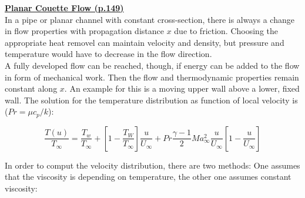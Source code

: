 \documentclass[8pt, landscape, fleqn]{scrartcl}
\begin{document}
\begin{multicols*}{3}
\underline{\textbf{Planar Couette Flow (p.149)}} \\
In a pipe or planar channel with constant cross-section, there is always a change in flow properties with propagation distance $x$ due to friction. Choosing the appropriate heat removel can maintain velocity and density, but pressure and temperature would have to decrease in the flow direction.\\
A fully developed flow can be reached, though, if energy can be added to the flow in form of mechanical work. Then the flow and thermodynamic properties remain constant along $x$. An example for this is a moving upper wall above a lower, fixed wall. The solution for the temperature distribution as function of local velocity is ($Pr = \mu c_p / k$):

\begin{equation*}
    \frac{T(u)}{T_\infty} = \frac{T_w}{T_\infty}+ \left[1-\frac{T_W}{T_\infty}\right]\frac{u}{U_\infty} + Pr \frac{\gamma-1}{2}Ma^2_\infty \frac{u}{U_\infty}\left[1-\frac{u}{U_\infty}\right]
\end{equation*}

In order to comput the velocity distribution, there are two methods: One assumes that the viscosity is depending on temperature, the other one assumes constant viscosity:


\end{multicols*}
\end{document}
